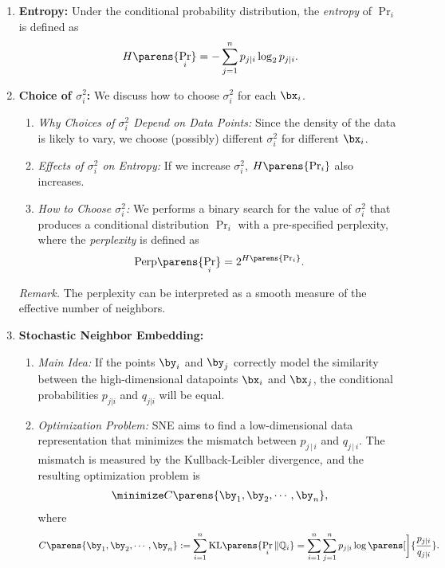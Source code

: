 \documentclass[12pt]{article}
\begin{document}
\begin{enumerate}[label=\textbf{\arabic*.}]
	\item \textbf{Entropy:} Under the conditional probability distribution, the \emph{entropy} of $\Pr_i$ is defined as 
	\begin{align*}
		H \parens{\Pr_i} = - \sum_{j=1}^n p_{j \vert i} \log_2 p_{j \vert i}. 
	\end{align*}
	
	\item \textbf{Choice of $\sigma_i^2$:} We discuss how to choose $\sigma_i^2$ for each $\bx_i$. 
	\begin{enumerate}
		\item \textit{Why Choices of $\sigma_i^2$ Depend on Data Points:} Since the density of the data is likely to vary, we choose (possibly) different $\sigma_i^2$ for different $\bx_i$. 
		\item \textit{Effects of $\sigma_i^2$ on Entropy:} If we increase $\sigma_i^2$, $H \parens{\Pr_i}$ also increases. 
		\item \textit{How to Choose $\sigma_i^2$:} We performs a binary search for the value of $\sigma_i^2$ that produces a conditional distribution $\Pr_i$ with a pre-specified perplexity, where the \emph{perplexity} is defined as 
		\begin{align*}
			\mathrm{Perp} \parens{\Pr_i} = 2^{H \parens{\Pr_i}}. 
		\end{align*}
	\end{enumerate}
	
	\textit{Remark.} The perplexity can be interpreted as a smooth measure of the effective number of neighbors. 
	
	\item \textbf{Stochastic Neighbor Embedding:}
	\begin{enumerate}
		\item \textit{Main Idea:} If the points $\by_i$ and $\by_j$ correctly model the similarity between the high-dimensional datapoints $\bx_i$ and $\bx_j$, the conditional probabilities $p_{j \vert i}$ and $q_{j \vert i}$ will be equal. 
		
		\item \textit{Optimization Problem:} SNE aims to find a low-dimensional data representation that minimizes the mismatch between $p_{j\,\vert\,i}$ and $q_{j\,\vert\,i}$. The mismatch is measured by the Kullback-Leibler divergence, and the resulting optimization problem is 
		\begin{align*}
			\minimize C \parens{\by_1, \by_2, \cdots, \by_n}, 
		\end{align*}
		where 
		\begin{align}\label{eq-sne-obj}
			C \parens{\by_1, \by_2, \cdots, \by_n} := \sum_{i=1}^n \mathrm{KL} \parens{\Pr_i \Vert \mathbb{Q}_i} = \sum_{i=1}^n \sum_{j=1}^n p_{j \vert i} \log \parens[\bigg]{\frac{p_{j \vert i}}{q_{j \vert i}}}. 
		\end{align}
		

\end{enumerate}
\end{enumerate}
\end{document}
